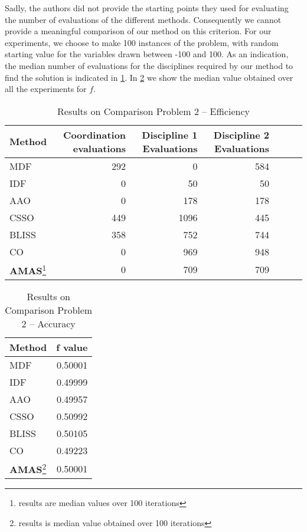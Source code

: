 Sadly, the authors did not provide the starting points they used for evaluating the number of evaluations of the different methods. Consequently we cannot provide a meaningful comparison of our method on this criterion. For our experiments, we choose to make 100 instances of the problem, with random starting value for the variables drawn between -100 and 100. As an indication, the median number of evaluations for the disciplines required by our method to find the solution is indicated in \tablename{}  \ref{bench2_efficiency}. In \tablename{} \ref{bench2_accuracy} we show the median value obtained over all the experiments for $f$. 

\begin{savenotes}
\begin{table}
\caption{Results on Comparison Problem 2  -- Efficiency}\label{bench2_efficiency}
\centering
\begin{tabular}{lrrrrrr}
\toprule
Method & Coordination evaluations & Discipline 1 Evaluations & Discipline 2 Evaluations \\
\midrule
MDF					&	292	&	0			&	584	\\
IDF						&	0		&	50		&	50	\\
AAO					&	0		&	178		&	178	\\
CSSO					&	449	&	1096	&	445	\\
BLISS					&	358	&	752		&	744	\\
CO						&	0		&	969		&	948	\\
\textbf{AMAS}\footnote{results are median values over 100 iterations}	&	0	&	709	&	709	\\
\bottomrule
\end{tabular}
\end{table}
\end{savenotes}

\begin{savenotes}
\begin{table}[h]
\caption{Results on Comparison Problem 2 -- Accuracy}\label{bench2_accuracy}
\centering
\begin{tabular}{lr}
\toprule
Method & f value \\
\midrule
MDF			&		0.50001	\\
IDF				&		0.49999	\\
AAO			&		0.49957	\\
CSSO			&		0.50992	\\
BLISS			&		0.50105	\\
CO				&		0.49223	\\
\textbf{AMAS}\footnote{results is median value obtained over 100 iterations}	&	0.50001	 \\
\bottomrule
\end{tabular}
\end{table}
\end{savenotes}


